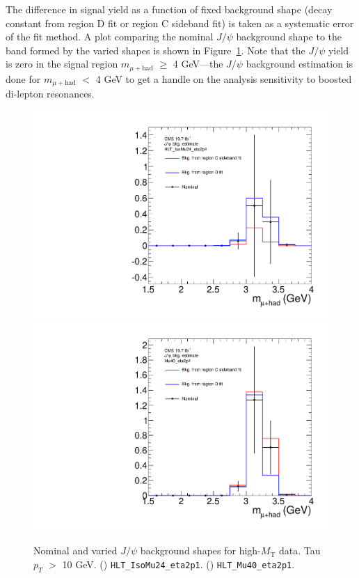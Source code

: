 The difference in signal yield as a function of fixed background shape (decay constant from region D fit or region C sideband fit) is taken as a systematic error of the fit method.  A plot comparing the nominal $J\slash\psi$ background shape to the band formed by the varied shapes is shown in Figure~\ref{fig:res-bkg-syst}.  Note that the $J\slash\psi$ yield is zero in the signal region $m_{\mu+\text{had}}$ $\geq$ 4 GeV---the $J\slash\psi$ background estimation is done for $m_{\mu+\text{had}}$ $<$ 4 GeV to get a handle on the analysis sensitivity to boosted di-lepton resonances.

\begin{figure}[hbtp]
  \begin{center}
    \includegraphics[width=\cmsFigWidth]{figures/resBkgSystCanvas_HLT_IsoMu24_eta2p1}
    \includegraphics[width=\cmsFigWidth]{figures/resBkgSystCanvas_Mu40_eta2p1}
    \caption{Nominal and varied $J\slash\psi$ background shapes for high-$M_{\text{T}}$ data.  Tau $p_T$ $>$ 10 GeV.  (\cmsLeft) \texttt{HLT\_IsoMu24\_eta2p1}.  (\cmsRight) \texttt{HLT\_Mu40\_eta2p1}.}
    \label{fig:res-bkg-syst}
  \end{center}
\end{figure}


